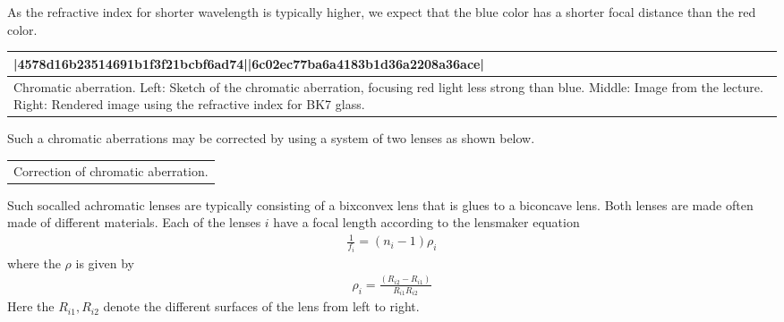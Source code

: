 \documentclass[letterpaper,10pt,english]{sphinxmanual}
\begin{document}
As the refractive index for shorter wavelength is typically higher, we expect that the blue color has a shorter focal distance than the red color.


\begin{savenotes}\sphinxattablestart
\centering
\begin{tabulary}{\linewidth}[t]{|T|}
\hline
\sphinxstyletheadfamily 
{} {\color{red}\bfseries{}|4578d16b23514691b1f3f21bcbf6ad74||6c02ec77ba6a4183b1d36a2208a36ace|}
\\
\hline
{} Chromatic aberration. Left: Sketch of the chromatic aberration, focusing red light less strong than blue. Middle: Image from the lecture. Right: Rendered image using the refractive index for BK7 glass.
\\
\hline
\end{tabulary}
\par
\sphinxattableend\end{savenotes}

Such a chromatic aberrations may be corrected by using a system of two lenses as shown below.


\begin{savenotes}\sphinxattablestart
\centering
\begin{tabulary}{\linewidth}[t]{|T|}
\hline
\sphinxstyletheadfamily 
{}
\\
\hline
{} Correction of chromatic aberration.
\\
\hline
\end{tabulary}
\par
\sphinxattableend\end{savenotes}

Such so\sphinxhyphen{}called achromatic lenses are typically consisting of a bixconvex lens that is glues to a bi\sphinxhyphen{}concave lens. Both lenses are made often made of different materials. Each of the lenses \(i\) have a focal length according to the lensmaker equation
\begin{equation*}
\begin{split}\frac{1}{f_i}=(n_i-1)\rho_i\end{split}
\end{equation*}
where the \(\rho\) is given by
\begin{equation*}
\begin{split}\rho_i=\frac{(R_{i2}-R_{i1})}{R_{i1}R_{i2}}\end{split}
\end{equation*}
Here the \(R_{i1},R_{i2}\) denote the different surfaces of the lens from left to right.
\end{document}
